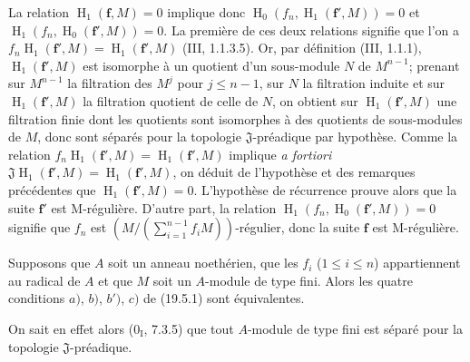 
La relation $\operatorname{H}_1(\mathbf f,M)=0$ implique donc $\operatorname{H}_0(f_n,\operatorname{H}_1(\mathbf f',M))=0$ et $\operatorname{H}_1(f_n,\operatorname{H}_0(\mathbf f',M))=0$. La première de ces deux relations signifie que l'on a $f_n\operatorname{H}_1(\mathbf f',M)=\operatorname{H}_1(\mathbf f',M)$ (III, 1.1.3.5). Or, par définition (III, 1.1.1), $\operatorname{H}_1(\mathbf f',M)$ est isomorphe à un quotient d'un sous-module $N$ de $M^{n-1}$; prenant sur $M^{n-1}$ la filtration des $M^j$ pour $j\leq n-1$, sur $N$ la filtration induite et sur $\operatorname{H}_1(\mathbf f',M)$ la filtration quotient de celle de $N$, on obtient sur $\operatorname{H}_1(\mathbf f',M)$ une filtration finie dont les quotients sont isomorphes à des quotients de sous-modules de $M$, donc sont séparés pour la topologie $\mathfrak J$-préadique par hypothèse. Comme la relation $f_n\operatorname{H}_1(\mathbf f',M)=\operatorname{H}_1(\mathbf f',M)$ implique \emph{a fortiori} $\mathfrak J\operatorname{H}_1(\mathbf f',M)=\operatorname{H}_1(\mathbf f',M)$, on déduit de l'hypothèse et des remarques précédentes que $\operatorname{H}_1(\mathbf f',M)=0$. L'hypothèse de récurrence prouve alors que la suite $\mathbf f'$ est M-régulière. D'autre part, la relation $\operatorname{H}_1(f_n,\operatorname{H}_0(\mathbf f',M))=0$ signifie que $f_n$ est $(M/(\sum_{i=1}^{n-1}f_iM))$-régulier, donc la suite $\mathbf f$ est M-régulière.

\begin{corollary}[19.5.2]
\label{IV.19.5.2}
Supposons que $A$ soit un anneau noethérien, que les $f_i$ ($1\leq i\leq n$) appartiennent au radical de $A$ et que $M$ soit un $A$-module de type fini. Alors les quatre conditions $a)$, $b)$, $b')$, $c)$ de (19.5.1) sont équivalentes.
\end{corollary}

On sait en effet alors ($0_{\mathrm I}$, 7.3.5) que tout $A$-module de type fini est séparé pour la topologie $\mathfrak J$-préadique.

